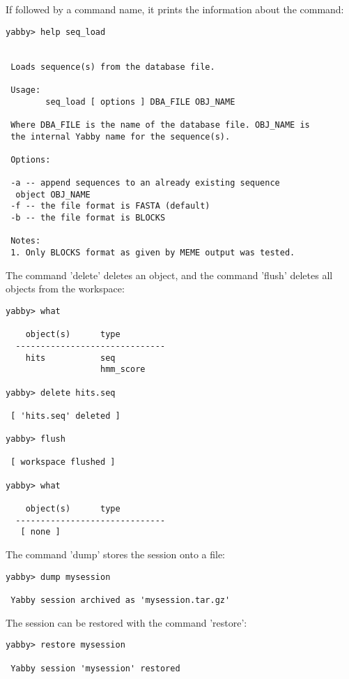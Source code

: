 If followed by a command name, it prints the information
about the command:

\begin{verbatim}
yabby> help seq_load


 Loads sequence(s) from the database file.

 Usage:
        seq_load [ options ] DBA_FILE OBJ_NAME

 Where DBA_FILE is the name of the database file. OBJ_NAME is
 the internal Yabby name for the sequence(s).

 Options:

 -a -- append sequences to an already existing sequence
  object OBJ_NAME
 -f -- the file format is FASTA (default)
 -b -- the file format is BLOCKS

 Notes:
 1. Only BLOCKS format as given by MEME output was tested.
\end{verbatim}


The command 'delete' deletes an object, and the command 'flush'
deletes all objects from the workspace:

\begin{verbatim}
yabby> what

    object(s)      type
  ------------------------------
    hits           seq           
                   hmm_score     

yabby> delete hits.seq

 [ 'hits.seq' deleted ]

yabby> flush

 [ workspace flushed ]

yabby> what

    object(s)      type
  ------------------------------
   [ none ]
\end{verbatim}


The command 'dump' stores the session onto a file:

\begin{verbatim}
yabby> dump mysession

 Yabby session archived as 'mysession.tar.gz'
\end{verbatim}

The session can be restored with the command 'restore':

\begin{verbatim}
yabby> restore mysession

 Yabby session 'mysession' restored
\end{verbatim}

